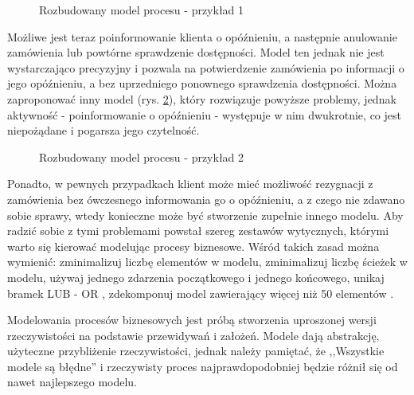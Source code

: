 \begin{figure}[h]
	\caption{\label{fig:complicated_business_process_1}Rozbudowany model procesu - przykład 1}
\end{figure}

Możliwe jest teraz poinformowanie klienta o opóźnieniu, a następnie anulowanie zamówienia lub powtórne sprawdzenie dostępności. Model ten jednak nie jest wystarczająco precyzyjny i pozwala na potwierdzenie zamówienia po informacji o jego opóźnieniu, a bez uprzedniego ponownego sprawdzenia dostępności. Można zaproponować inny model (rys. \ref{fig:complicated_business_process_2}), który rozwiązuje powyższe problemy, jednak aktywność - poinformowanie o opóźnieniu - występuje w nim dwukrotnie, co jest niepożądane i  pogarsza jego czytelność.

\begin{figure}[h]
	\caption{\label{fig:complicated_business_process_2}Rozbudowany model procesu - przykład 2}
\end{figure}

Ponadto, w pewnych przypadkach klient może mieć możliwość rezygnacji z zamówienia bez ówczesnego informowania go o opóźnieniu, a z czego nie zdawano sobie sprawy, wtedy konieczne może być stworzenie zupełnie innego modelu. Aby radzić sobie z tymi problemami powstał szereg zestawów wytycznych, którymi warto się kierować modelując procesy biznesowe. Wśród takich zasad można wymienić: zminimalizuj liczbę elementów w modelu, zminimalizuj liczbę ścieżek w modelu, używaj jednego zdarzenia początkowego i jednego końcowego, unikaj bramek LUB - OR , zdekomponuj model zawierający więcej niż 50 elementów \cite{7PMG}.

Modelowania procesów biznesowych jest próbą stworzenia uproszonej wersji rzeczywistości na podstawie przewidywań i założeń. Modele dają abstrakcję, użyteczne przybliżenie rzeczywistości, jednak należy pamiętać, że ,,Wszystkie modele są błędne'' i rzeczywisty proces najprawdopodobniej będzie różnił się od nawet najlepszego modelu. 


